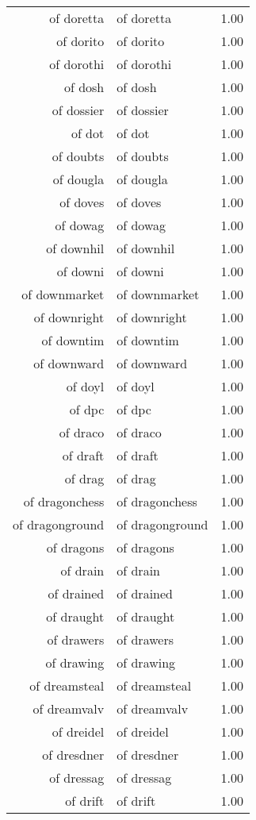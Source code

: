 \begin{table}[ht]
\begin{tabular}{rlr}
  of doretta & of doretta & 1.00 \\ 
  of dorito & of dorito & 1.00 \\ 
  of dorothi & of dorothi & 1.00 \\ 
  of dosh & of dosh & 1.00 \\ 
  of dossier & of dossier & 1.00 \\ 
  of dot & of dot & 1.00 \\ 
  of doubts & of doubts & 1.00 \\ 
  of dougla & of dougla & 1.00 \\ 
  of doves & of doves & 1.00 \\ 
  of dowag & of dowag & 1.00 \\ 
  of downhil & of downhil & 1.00 \\ 
  of downi & of downi & 1.00 \\ 
  of downmarket & of downmarket & 1.00 \\ 
  of downright & of downright & 1.00 \\ 
  of downtim & of downtim & 1.00 \\ 
  of downward & of downward & 1.00 \\ 
  of doyl & of doyl & 1.00 \\ 
  of dpc & of dpc & 1.00 \\ 
  of draco & of draco & 1.00 \\ 
  of draft & of draft & 1.00 \\ 
  of drag & of drag & 1.00 \\ 
  of dragonchess & of dragonchess & 1.00 \\ 
  of dragonground & of dragonground & 1.00 \\ 
  of dragons & of dragons & 1.00 \\ 
  of drain & of drain & 1.00 \\ 
  of drained & of drained & 1.00 \\ 
  of draught & of draught & 1.00 \\ 
  of drawers & of drawers & 1.00 \\ 
  of drawing & of drawing & 1.00 \\ 
  of dreamsteal & of dreamsteal & 1.00 \\ 
  of dreamvalv & of dreamvalv & 1.00 \\ 
  of dreidel & of dreidel & 1.00 \\ 
  of dresdner & of dresdner & 1.00 \\ 
  of dressag & of dressag & 1.00 \\ 
  of drift & of drift & 1.00 \\ 

\end{tabular}
\end{table}
